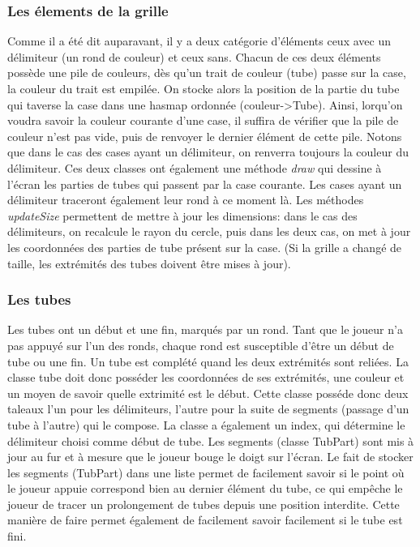 \documentclass[12pt, a4paper]{article}%
\begin{document}
    \subsubsection{Les élements de la grille}
    Comme il a été dit auparavant, il y a deux catégorie d'éléments ceux avec un délimiteur (un rond de couleur) et ceux sans.
    Chacun de ces deux éléments possède une pile de couleurs, dès qu'un trait de couleur (tube) passe sur la case, la couleur du
    trait est empilée. On stocke alors la position de la partie du tube qui taverse la case dans une hasmap ordonnée
    (couleur->Tube). Ainsi, lorqu'on voudra savoir la couleur courante d'une case, il suffira de vérifier que la pile de couleur
    n'est pas vide, puis de renvoyer le dernier élément de cette pile. Notons que dans le cas des cases ayant un délimiteur, on
    renverra toujours la couleur du délimiteur. Ces deux classes ont également une méthode \textit{draw} qui dessine à l'écran les
    parties de tubes qui passent par la case courante. Les cases ayant un délimiteur traceront également leur rond à ce moment là.
    Les méthodes \textit{updateSize} permettent de mettre à jour les dimensions: dans le cas des délimiteurs, on recalcule le
    rayon du cercle, puis dans les deux cas, on met à jour les coordonnées des parties de tube présent sur la case. (Si la grille
    a changé de taille, les extrémités des tubes doivent être mises à jour).
    \subsubsection{Les tubes}
    Les tubes ont un début et une fin, marqués par un rond. Tant que le joueur n'a pas appuyé sur l'un des ronds, chaque rond est
    susceptible d'être un début de tube ou une fin. Un tube est complété quand les deux extrémités sont reliées. La classe tube
    doit donc posséder les coordonnées de ses extrémités, une couleur et un moyen de savoir quelle extrimité est le début. 
    Cette classe posséde donc deux taleaux l'un pour les délimiteurs, l'autre pour la suite de segments (passage d'un tube à
    l'autre) qui le compose. La classe a également un index, qui détermine le délimiteur choisi comme début de tube.
    Les segments (classe TubPart) sont mis à jour au fur et à mesure que le joueur bouge le doigt sur l'écran.
    Le fait de  stocker les segments (TubPart) dans une liste permet de facilement savoir si le point où le joueur appuie
    correspond bien au dernier élément du tube, ce qui empêche le joueur de tracer un prolongement de tubes depuis une position
    interdite. Cette manière de faire permet également de facilement savoir facilement si le tube est fini.
    \newline
\end{document}
